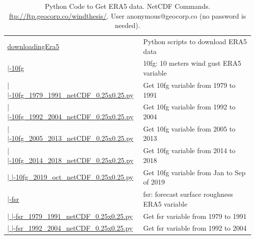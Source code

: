 \documentclass[12pt,twoside]{reedthesis}
\begin{document}
\begingroup\fontsize{8}{10}\selectfont
\begin{longtable}[t]{>{\raggedright\arraybackslash}p{2.3in}>{\raggedright\arraybackslash}p{3in}}
\caption[Python Code to Get ERA5 data. NetCDF Commands]{\label{tab:pythonera5}Python Code to Get ERA5 data. NetCDF Commands.  \href{ftp://ftp.geocorp.co/windthesis/}{ftp://ftp.geocorp.co/windthesis/}. User anonymous@geocorp.co (no password is needed).}\\
\toprule
\multicolumn{1}{l}{Folder Tree - Ftp Links} & \multicolumn{1}{l}{Description}\\
\midrule
\href{ftp://ftp.geocorp.co/windthesis/downloadingEra5/}{downloadingEra5} & Python scripts to download ERA5 data\\
\href{ftp://ftp.geocorp.co/windthesis/downloadingEra5/10fg/}{  |-10fg} & 10fg: 10 meters wind gust ERA5 variable\\
\href{ftp://ftp.geocorp.co/windthesis/downloadingEra5/10fg/10fg_1979_1991_netCDF_0.25x0.25.py}{  |    |-10fg\_1979\_1991\_netCDF\_0.25x0.25.py} & Get 10fg variable from 1979 to 1991\\
\href{ftp://ftp.geocorp.co/windthesis/downloadingEra5/10fg/10fg_1992_2004_netCDF_0.25x0.25.py}{  |    |-10fg\_1992\_2004\_netCDF\_0.25x0.25.py} & Get 10fg variable from 1992 to 2004\\
\href{ftp://ftp.geocorp.co/windthesis/downloadingEra5/10fg/10fg_2005_2013_netCDF_0.25x0.25.py}{  |    |-10fg\_2005\_2013\_netCDF\_0.25x0.25.py} & Get 10fg variable from 2005 to 2013\\
\href{ftp://ftp.geocorp.co/windthesis/downloadingEra5/10fg/10fg_2014_2018_netCDF_0.25x0.25.py}{  |    |-10fg\_2014\_2018\_netCDF\_0.25x0.25.py} & Get 10fg variable from 2014 to 2018\\
\href{ftp://ftp.geocorp.co/windthesis/downloadingEra5/10fg/10fg_2019_oct_netCDF_0.25x0.25.py}{  |    |-10fg\_2019\_oct\_netCDF\_0.25x0.25.py} & Get 10fg variable from Jan to Sep of 2019\\
\href{ftp://ftp.geocorp.co/windthesis/downloadingEra5/fsr/}{  |-fsr} & fsr: forecast surface roughness ERA5 variable\\
\href{ftp://ftp.geocorp.co/windthesis/downloadingEra5/fsr/fsr_1979_1991_netCDF_0.25x0.25.py}{  |    |-fsr\_1979\_1991\_netCDF\_0.25x0.25.py} & Get fsr variable from 1979 to 1991\\
\href{ftp://ftp.geocorp.co/windthesis/downloadingEra5/fsr/fsr_1992_2004_netCDF_0.25x0.25.py}{  |    |-fsr\_1992\_2004\_netCDF\_0.25x0.25.py} & Get fsr variable from 1992 to 2004\\

\end{longtable}
\end{document}
